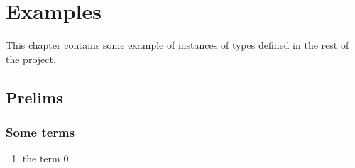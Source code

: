\chapter{Examples}
This chapter contains some example of instances of types defined in the rest of the project.
\section{Prelims}
\subsection{Some terms}
\begin{enumerate}
    \item {}\leanok the term 0.
\end{enumerate}
